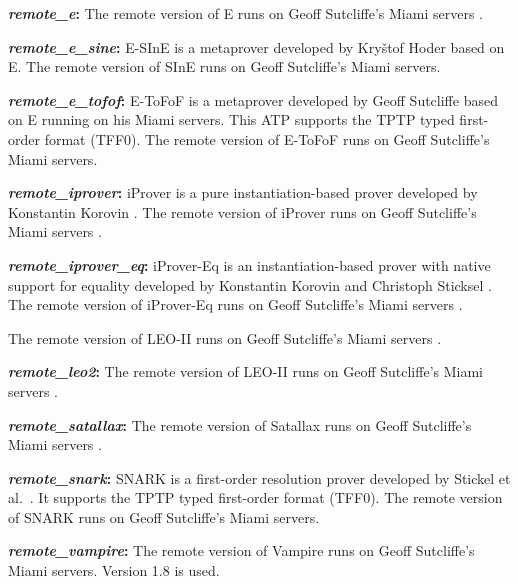 \documentclass[a4paper,12pt]{article}
\begin{document}
\begin{enum}
\begin{enum}
\item[\labelitemi] \textbf{\textit{remote\_e}:} The remote version of E runs
on Geoff Sutcliffe's Miami servers \cite{sutcliffe-2000}.

\item[\labelitemi] \textbf{\textit{remote\_e\_sine}:} E-SInE is a metaprover
developed by Kry\v stof Hoder \cite{sine} based on E. The remote version of
SInE runs on Geoff Sutcliffe's Miami servers.

\item[\labelitemi] \textbf{\textit{remote\_e\_tofof}:} E-ToFoF is a metaprover
developed by Geoff Sutcliffe \cite{tofof} based on E running on his Miami
servers. This ATP supports the TPTP typed first-order format (TFF0). The
remote version of E-ToFoF runs on Geoff Sutcliffe's Miami servers.

\item[\labelitemi] \textbf{\textit{remote\_iprover}:} iProver is a pure
instantiation-based prover developed by Konstantin Korovin \cite{korovin-2009}. The
remote version of iProver runs on Geoff Sutcliffe's Miami servers
\cite{sutcliffe-2000}.

\item[\labelitemi] \textbf{\textit{remote\_iprover\_eq}:} iProver-Eq is an
instantiation-based prover with native support for equality developed by
Konstantin Korovin and Christoph Sticksel \cite{korovin-sticksel-2010}. The
remote version of iProver-Eq runs on Geoff Sutcliffe's Miami servers
\cite{sutcliffe-2000}.

The remote version of LEO-II
runs on Geoff Sutcliffe's Miami servers \cite{sutcliffe-2000}.

\item[\labelitemi] \textbf{\textit{remote\_leo2}:} The remote version of LEO-II
runs on Geoff Sutcliffe's Miami servers \cite{sutcliffe-2000}.

\item[\labelitemi] \textbf{\textit{remote\_satallax}:} The remote version of
Satallax runs on Geoff Sutcliffe's Miami servers \cite{sutcliffe-2000}.

\item[\labelitemi] \textbf{\textit{remote\_snark}:} SNARK is a first-order
resolution prover developed by Stickel et al.\ \cite{snark}. It supports the
TPTP typed first-order format (TFF0). The remote version of SNARK runs on
Geoff Sutcliffe's Miami servers.

\item[\labelitemi] \textbf{\textit{remote\_vampire}:} The remote version of
Vampire runs on Geoff Sutcliffe's Miami servers. Version 1.8 is used.


\end{enum}
\end{enum}
\end{document}
